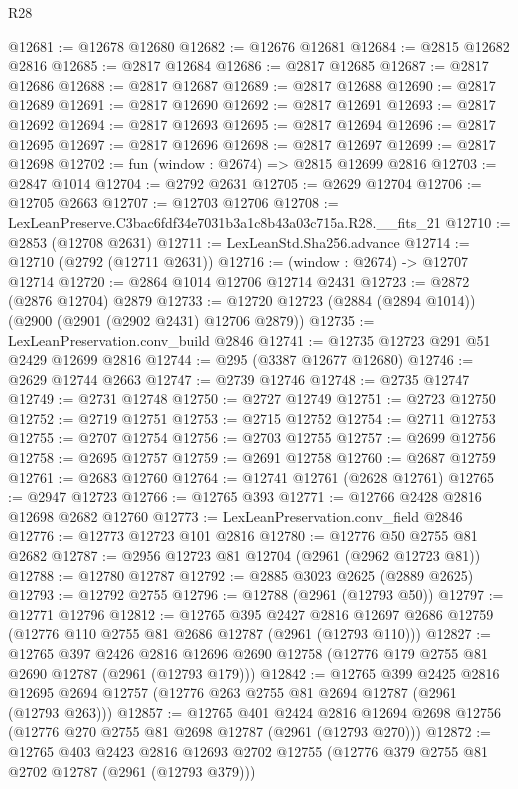 \begin{lexlean}{R28}
\begin{coremodule}
@12681 := @12678 @12680
@12682 := @12676 @12681
@12684 := @2815 @12682 @2816
@12685 := @2817 @12684
@12686 := @2817 @12685
@12687 := @2817 @12686
@12688 := @2817 @12687
@12689 := @2817 @12688
@12690 := @2817 @12689
@12691 := @2817 @12690
@12692 := @2817 @12691
@12693 := @2817 @12692
@12694 := @2817 @12693
@12695 := @2817 @12694
@12696 := @2817 @12695
@12697 := @2817 @12696
@12698 := @2817 @12697
@12699 := @2817 @12698
@12702 := fun (window : @2674) => @2815 @12699 @2816
@12703 := @2847 @1014
@12704 := @2792 @2631
@12705 := @2629 @12704
@12706 := @12705 @2663
@12707 := @12703 @12706
@12708 := LexLeanPreserve.C3bac6fdf34e7031b3a1c8b43a03c715a.R28.__fits_21
@12710 := @2853 (@12708 @2631)
@12711 := LexLeanStd.Sha256.advance
@12714 := @12710 (@2792 (@12711 @2631))
@12716 := (window : @2674) -> @12707 @12714
@12720 := @2864 @1014 @12706 @12714 @2431
@12723 := @2872 (@2876 @12704) @2879
@12733 := @12720 @12723 (@2884 (@2894 @1014)) (@2900 (@2901 (@2902 @2431) @12706 @2879))
@12735 := LexLeanPreservation.conv_build @2846
@12741 := @12735 @12723 @291 @51 @2429 @12699 @2816
@12744 := @295 (@3387 @12677 @12680)
@12746 := @2629 @12744 @2663
@12747 := @2739 @12746
@12748 := @2735 @12747
@12749 := @2731 @12748
@12750 := @2727 @12749
@12751 := @2723 @12750
@12752 := @2719 @12751
@12753 := @2715 @12752
@12754 := @2711 @12753
@12755 := @2707 @12754
@12756 := @2703 @12755
@12757 := @2699 @12756
@12758 := @2695 @12757
@12759 := @2691 @12758
@12760 := @2687 @12759
@12761 := @2683 @12760
@12764 := @12741 @12761 (@2628 @12761)
@12765 := @2947 @12723
@12766 := @12765 @393
@12771 := @12766 @2428 @2816 @12698 @2682 @12760
@12773 := LexLeanPreservation.conv_field @2846
@12776 := @12773 @12723 @101 @2816
@12780 := @12776 @50 @2755 @81 @2682
@12787 := @2956 @12723 @81 @12704 (@2961 (@2962 @12723 @81))
@12788 := @12780 @12787
@12792 := @2885 @3023 @2625 (@2889 @2625)
@12793 := @12792 @2755
@12796 := @12788 (@2961 (@12793 @50))
@12797 := @12771 @12796
@12812 := @12765
    @395
    @2427
    @2816
    @12697
    @2686
    @12759
    (@12776 @110 @2755 @81 @2686 @12787 (@2961 (@12793 @110)))
@12827 := @12765
    @397
    @2426
    @2816
    @12696
    @2690
    @12758
    (@12776 @179 @2755 @81 @2690 @12787 (@2961 (@12793 @179)))
@12842 := @12765
    @399
    @2425
    @2816
    @12695
    @2694
    @12757
    (@12776 @263 @2755 @81 @2694 @12787 (@2961 (@12793 @263)))
@12857 := @12765
    @401
    @2424
    @2816
    @12694
    @2698
    @12756
    (@12776 @270 @2755 @81 @2698 @12787 (@2961 (@12793 @270)))
@12872 := @12765
    @403
    @2423
    @2816
    @12693
    @2702
    @12755
    (@12776 @379 @2755 @81 @2702 @12787 (@2961 (@12793 @379)))

\end{coremodule}
\end{lexlean}
